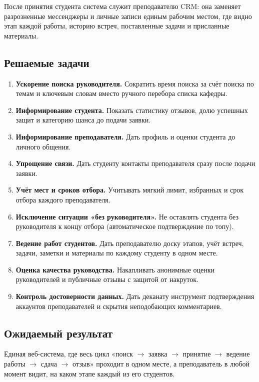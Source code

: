 \documentclass[a4paper,12pt]{article}
\begin{document}
После принятия студента система служит преподавателю CRM: она заменяет разрозненные мессенджеры и личные записи единым рабочим местом, где видно этап каждой работы, историю встреч, поставленные задачи и присланные материалы.

\subsection{Решаемые задачи}
\begin{enumerate}
  \item \textbf{Ускорение поиска руководителя.} Сократить время поиска за счёт поиска по темам и ключевым словам вместо ручного перебора списка кафедры.
  \item \textbf{Информирование студента.} Показать статистику отзывов, долю успешных защит и категорию шанса до подачи заявки.
  \item \textbf{Информирование преподавателя.} Дать профиль и оценки студента до личного общения.
  \item \textbf{Упрощение связи.} Дать студенту контакты преподавателя сразу после подачи заявки.
  \item \textbf{Учёт мест и сроков отбора.} Учитывать мягкий лимит, избранных и срок отбора каждого преподавателя.
  \item \textbf{Исключение ситуации «без руководителя».} Не оставлять студента без руководителя к концу отбора (автоматическое подтверждение по топу).
  \item \textbf{Ведение работ студентов.} Дать преподавателю доску этапов, учёт встреч, задачи, заметки и материалы по каждому студенту в одном месте.
  \item \textbf{Оценка качества руководства.} Накапливать анонимные оценки руководителей и публичные отзывы с защитой от накруток.
  \item \textbf{Контроль достоверности данных.} Дать деканату инструмент подтверждения аккаунтов преподавателей и скрытия неподобающих комментариев.
\end{enumerate}

\subsection{Ожидаемый результат}
Единая веб-система, где весь цикл «поиск $\rightarrow$ заявка $\rightarrow$ принятие $\rightarrow$ ведение работы $\rightarrow$ сдача $\rightarrow$ отзыв» проходит в одном месте, а преподаватель в любой момент видит, на каком этапе каждый из его студентов.
\end{document}
